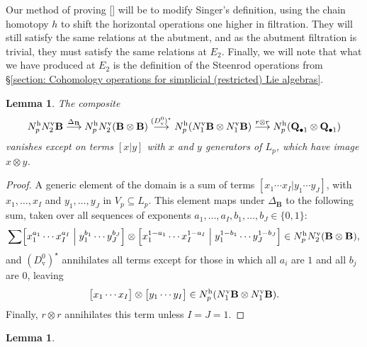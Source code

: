 \documentclass[11pt]{amsart} \renewcommand{\baselinestretch}{1.4}
\theoremstyle{plain}
\newtheorem{lem}[thm]{Lemma}
\theoremstyle{definition}
\renewcommand{\to}{\longrightarrow}
\newcommand{\DeltatubfD}{\Delta_{\mathrm{\textbf{B}}}}
\newcommand{\uver}{^\mathrm{v}}
\newcommand{\uhor}{^\mathrm{h}}
\newcommand{\dver}{_\mathrm{v}}
\begin{document}
\begin{appendices}
{Our method of proving [] will be to modify Singer's definition, using the chain homotopy $h$ to shift the horizontal operations one higher in filtration. They will still satisfy the same relations at the abutment, and as the abutment filtration is trivial, they must satisfy the same relations at $E_2$. Finally, we will note that what we have produced at $E_2$ is the definition of the Steenrod operations from \S\ref{section: Cohomology operations for simplicial (restricted) Lie algebras}.}
\begin{lem}
\label{firstCompositeLemma}
The composite
\[N\uhor_{p}N\uver_2\textup{\textbf{B}}\overset{\DeltatubfD}{\to} N\uhor_{p}N\uver_2(\textup{\textbf{B}}\otimes\textup{\textbf{B}}) \overset{(D\dver^0)^\star}{\to} N\uhor_{p}(N\uver_1\textup{\textbf{B}}\otimes N\uver_1\textup{\textbf{B}})\overset{r\otimes r}{\to}N\uhor_p(\textup{\textbf{Q}}_{\bullet 1}\otimes \textup{\textbf{Q}}_{\bullet 1})\]
vanishes except on terms $[x|y]$ with $x$ and $y$ generators of $ L_p$, which have image $x\otimes y$.
\end{lem}
\begin{proof}
A generic element of the domain is a sum of terms $[x_1\cdots x_I|y_1\cdots y_J]$, with $x_1,\ldots,x_I$ and $y_1,\ldots,y_J$ in $V_p\subseteq L_p$. This element maps under $\DeltatubfD$ to the following sum, taken over all sequences of exponents $a_1,\ldots,a_I,b_1,\ldots,b_J\in\{0,1\}$:
\[\sum%
\textstyle\Bigl[x_1^{a_1}\cdots x_I^{a_I}\Bigm|y_1^{b_1}\cdots y_J^{b_J}\Bigr]\otimes
\Bigl[x_1^{1-a_1}\cdots x_I^{1-a_I}\Bigm|y_1^{1-b_1}\cdots y_J^{1-b_J}\Bigr]
\in N\uhor_{p}N\uver_2(\textup{\textbf{B}}\otimes\textup{\textbf{B}}),
\]
and $(D\dver^0)^\star$ annihilates all terms except for those in which all $a_i$ are $1$ and all $b_j$ are $0$, leaving
\[\bigl[x_1\cdots x_I\bigr]\otimes
\bigl[y_1\cdots y_I\bigr]\in N\uhor_{p}(N\uver_1\textup{\textbf{B}}\otimes N\uver_1\textup{\textbf{B}}).\]
Finally, $r\otimes r$ annihilates this term unless $I=J=1$.
\end{proof}
\begin{lem}
\label{secondCompositeLemma}

\end{lem}
\end{appendices}
\end{document}
